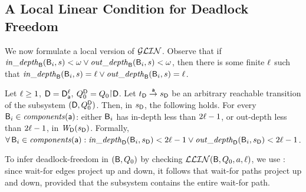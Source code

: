    \subsection{A Local Linear Condition for Deadlock Freedom}
   \label{s:condition}
%   

We now formulate a local version of $\GLin$. Observe that if
$\widepth{\B}{\B_i}{s} < \omega \lor \wodepth{\B}{\B_i}{s} < \omega$,
then there is some finite $\l$ such that 
$\widepth{\B}{\B_i}{s} = \l \lor \wodepth{\B}{\B_i}{s} = \l$.


\begin{definition} \label{def:ldfc-k}
\label{def:locLinear} \label{defn:LLin}
Let $\l \ge 1$, $\DS = \dsks{\act}{\l}$, $\QDS = Q_0 \pj \DS$.
Let $\tD \goesto[\act] \sD$ be an arbitrary reachable transition of the subsystem $(\DS, \QDS)$. 
Then, in $\sD$, the following holds. 
For every $\B_i \in \cmps{\act}$:  
either $\B_i$ has in-depth less than $2\l - 1$, or out-depth less than $2\l - 1$, in $\wfg{\dsk{\act}{\l}}{\sD}$. 
Formally,\\
\ind  $\fa \B_i \in \cmps{\act}: 
\widepth{\dsk{\act}{\l}}{\B_i}{\sD} < 2\l-1 \lor \wodepth{\dsk{\act}{\l}}{\B_i}{\sD} < 2\l-1$.
\end{definition}
%
To infer deadlock-freedom in $(\B, Q_0)$ by checking $\LLin(\B, Q_0, a, \l)$, we use : since wait-for edges project up and down,
it follows that wait-for paths project up and down, provided that the subsystem contains the entire wait-for path.


